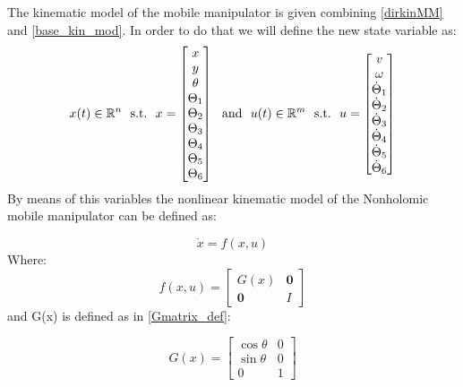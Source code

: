 The kinematic model of the mobile manipulator is given combining \ref{dirkinMM} and \ref{base_kin_mod}. In order to do that we will define the new state variable as:
\begin{equation}
{x}(t) \in \mathbb{R}^n\ \  \textnormal{s.t.}\ \  {x}  = \left[ \begin{matrix} x \\ y \\ \theta \\ \Theta_1 \\ \Theta_2 \\ \Theta_3 \\ \Theta_4 \\ \Theta_5 \\ \Theta_6 \end{matrix} \right]\ \   \textnormal{and}\ \  {u}(t) \in \mathbb{R}^m\ \ \textnormal{s.t.}\ \ {u}=\left[ \begin{matrix} v \\ \omega \\ \dot{\Theta}_1 \\ \dot{\Theta}_2 \\ \dot{\Theta}_3 \\ \dot{\Theta}_4 \\ \dot{\Theta}_5 \\ \dot{\Theta}_6 \end{matrix} \right]
\end{equation}
By means of this variables the nonlinear kinematic model of the Nonholomic mobile manipulator can be defined as:

\begin{equation} \label{system_base}
	\dot{{x}}=f({x},{u})
\end{equation} 
Where:
\begin{equation} \label{NLsystem}
	f({x},{u}) = \left[ \begin{matrix}
	G({x}) & \textbf{0} \\ \textbf{0} & I \end{matrix} \right]
\end{equation}
and G({x}) is defined as in \ref{Gmatrix_def}:

\begin{equation}
G({x}) =  \left[
\begin{matrix}
\cos\theta & 0 \\
\sin\theta & 0 \\
0 & 1 
\end{matrix}
\right] 
\end{equation}

